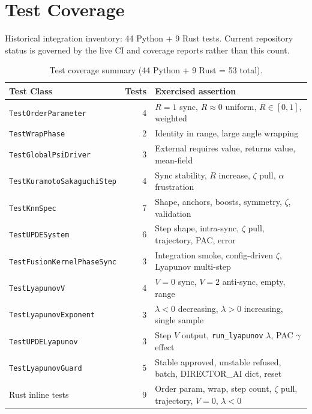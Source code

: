 \documentclass[11pt,a4paper]{article}
\begin{document}
\section{Test Coverage}

Historical integration inventory: 44 Python + 9 Rust tests. Current repository
status is governed by the live CI and coverage reports rather than this count.

\begin{table}[h]
\centering
\small
\begin{tabular}{@{}lrl@{}}
\toprule
\textbf{Test Class} & \textbf{Tests} & \textbf{Exercised assertion} \\
\midrule
\texttt{TestOrderParameter} & 4 & $R=1$ sync, $R\approx 0$ uniform, $R\in[0,1]$, weighted \\
\texttt{TestWrapPhase} & 2 & Identity in range, large angle wrapping \\
\texttt{TestGlobalPsiDriver} & 3 & External requires value, returns value, mean-field \\
\texttt{TestKuramotoSakaguchiStep} & 4 & Sync stability, $R$ increase, $\zeta$ pull, $\alpha$ frustration \\
\texttt{TestKnmSpec} & 7 & Shape, anchors, boosts, symmetry, $\zeta$, validation \\
\texttt{TestUPDESystem} & 6 & Step shape, intra-sync, $\zeta$ pull, trajectory, PAC, error \\
\texttt{TestFusionKernelPhaseSync} & 3 & Integration smoke, config-driven $\zeta$, Lyapunov multi-step \\
\texttt{TestLyapunovV} & 4 & $V=0$ sync, $V=2$ anti-sync, empty, range \\
\texttt{TestLyapunovExponent} & 3 & $\lambda<0$ decreasing, $\lambda>0$ increasing, single sample \\
\texttt{TestUPDELyapunov} & 3 & Step $V$ output, \texttt{run\_lyapunov} $\lambda$, PAC $\gamma$ effect \\
\texttt{TestLyapunovGuard} & 5 & Stable approved, unstable refused, batch, DIRECTOR\_AI dict, reset \\
\midrule
Rust inline tests & 9 & Order param, wrap, step count, $\zeta$ pull, trajectory, $V=0$, $\lambda<0$ \\
\bottomrule
\end{tabular}
\caption{Test coverage summary (44 Python + 9 Rust = 53 total).}
\end{table}
\end{document}
